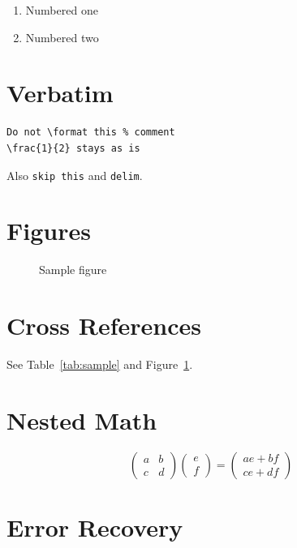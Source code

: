 \documentclass{article}
\begin{document}
\begin{enumerate}
\item Numbered one
\item Numbered two
\end{enumerate}

\section{Verbatim}

\begin{verbatim}
Do not \format this % comment
\frac{1}{2} stays as is
\end{verbatim}

Also \verb|skip this| and \verb!delim!.

\section{Figures}

\begin{figure}[h]
\centering
{}
\caption{Sample figure}
\label{fig:sample}
\end{figure}

\section{Cross References}

See Table~\ref{tab:sample} and Figure~\ref{fig:sample}.

\section{Nested Math}

\begin{equation}
\begin{pmatrix}
a & b \\
c & d
\end{pmatrix}
\begin{pmatrix}
e \\
f
\end{pmatrix}
=
\begin{pmatrix}
ae + bf \\
ce + df
\end{pmatrix}
\end{equation}

\section{Error Recovery}
\end{document}
